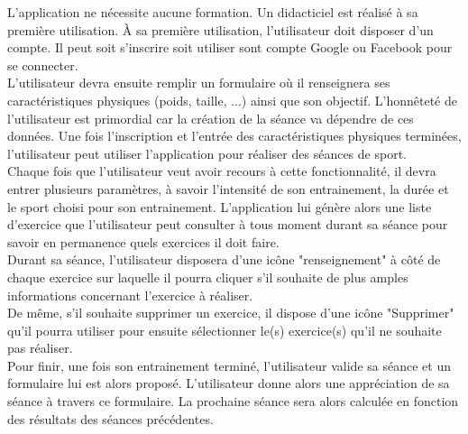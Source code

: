 L'application ne nécessite aucune formation. Un didacticiel est réalisé à sa première utilisation. À sa première utilisation, l'utilisateur doit disposer d'un compte. Il peut soit s'inscrire soit utiliser sont compte Google ou Facebook pour se connecter.\\

L'utilisateur devra ensuite remplir un formulaire où il renseignera ses caractéristiques physiques (poids, taille, ...) ainsi que son objectif. L'honnêteté de l'utilisateur est primordial car la création de la séance va dépendre de ces données. Une fois l'inscription et l'entrée des caractéristiques physiques terminées, l'utilisateur peut utiliser l'application pour réaliser des séances de sport.\\

Chaque fois que l'utilisateur veut avoir recours à cette fonctionnalité, il devra entrer plusieurs paramètres, à savoir l'intensité de son entrainement, la durée et le sport choisi pour son entrainement. L'application lui génère alors une liste d'exercice que l'utilisateur peut  consulter à tous moment durant sa séance pour savoir en permanence quels exercices il doit faire.\\

Durant sa séance, l'utilisateur disposera d'une icône "renseignement" à côté de chaque exercice sur laquelle il pourra cliquer s'il souhaite de plus amples informations concernant l'exercice à réaliser.\\

De même, s'il souhaite supprimer un exercice, il dispose d'une icône "Supprimer" qu'il pourra utiliser pour ensuite sélectionner le(s) exercice(s) qu'il ne souhaite pas réaliser.\\

Pour finir, une fois son entrainement terminé, l'utilisateur valide sa séance et un formulaire lui est alors proposé. L'utilisateur donne alors une appréciation de sa séance à travers ce formulaire. La prochaine séance sera alors calculée en fonction des résultats des séances précédentes.

